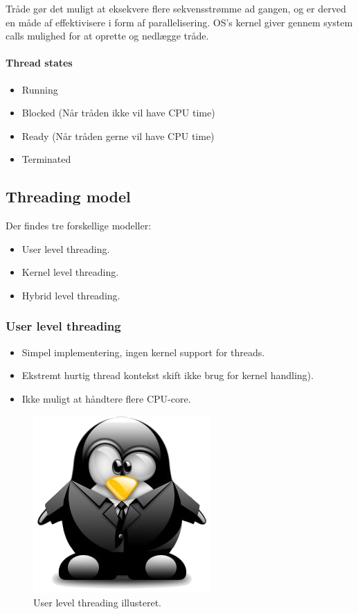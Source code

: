Tråde gør det muligt at eksekvere flere sekvensstrømme ad gangen, og er derved en måde af effektivisere i form af parallelisering. OS's kernel giver gennem system calls mulighed for at oprette og nedlægge tråde.

\paragraph{Thread states}
\begin{itemize}
	\item Running
	\item Blocked (Når tråden ikke vil have CPU time)
	\item Ready (Når tråden gerne vil have CPU time)
	\item Terminated
\end{itemize}


\subsection{Threading model}
Der findes tre forskellige modeller:

\begin{itemize}
	\item User level threading.
	\item Kernel level threading.
	\item Hybrid level threading.
\end{itemize}

\subsubsection{User level threading}
\begin{itemize}
	\item Simpel implementering, ingen kernel support for threads.
	\item Ekstremt hurtig thread kontekst skift ikke brug for kernel handling).
	\item Ikke muligt at håndtere flere CPU-core.
\end{itemize}

\begin{figure}[H]
	\centering
	\includegraphics{figs/userthreads}
	\caption{User level threading illusteret.}
	\label{fig:userthreads}
\end{figure}

